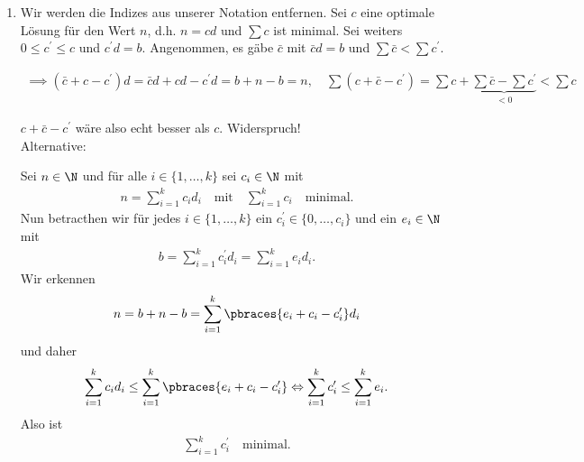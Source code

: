 
\begin{solution}

\phantom{}

\begin{enumerate}[label = \alph*]

  \item Wir werden die Indizes aus unserer Notation entfernen.
  Sei $c$ eine optimale Lösung für den Wert $n$, d.h. $n = c d$ und $\sum c$ ist minimal.
  Sei weiters $0 \leq c^\prime \leq c$ und $c^\prime d = b$.
  Angenommen, es gäbe $\bar c$ mit $\bar c d = b$ und $\sum \bar c < \sum c^\prime$.

  \begin{align*}
    \implies
    (\bar c + c - c^\prime) d
    =
    \bar c d + c d - c^\prime d
    =
    b + n - b
    =
    n,
    \quad
    \sum (c + \bar c - c^\prime)
    =
    \sum c + \underbrace{\sum \bar c - \sum c^\prime}_{< 0}
    <
    \sum c
  \end{align*}

  $c + \bar c - c^\prime$ wäre also echt besser als $c$.
  Widerspruch! \\
  
  Alternative: 
  
  Sei $n \in \N$ und für alle $i \in \{1, \dots, k\}$ sei $c_i \in \N$ mit
  \begin{align*}
  	n = \sum_{i = 1}^k c_i d_i \quad \text{mit} \quad \sum_{i = 1}^k c_i \quad \text{minimal.}
  \end{align*}
  Nun betracthen wir für jedes $i \in \{1, \dots, k\}$ ein $c_i^\prime \in \{0, \dots, c_i\}$ und ein $e_i \in \N$ mit
  \begin{align*}
  	b = \sum_{i = 1}^k c_i^\prime d_i = \sum_{i = 1}^k e_i d_i.
  \end{align*}
	Wir erkennen 
	\begin{align*}
		n = b + n - b = \sum_{i = 1}^k \pbraces{e_i + c_i - c_i^\prime} d_i
	\end{align*}
	und daher
	\begin{align*}
		\sum_{i = 1}^k c_i d_i \leq \sum_{i = 1}^k \pbraces{e_i + c_i - c_i^\prime}  \Leftrightarrow \sum_{i = 1}^k c_i^\prime \leq \sum_{i = 1}^k e_i.
	\end{align*}
	Also ist 
	\begin{align*}
		 \sum_{i = 1}^k c_i^\prime \quad \text{minimal.}
	\end{align*}


\end{enumerate}
\end{solution}
